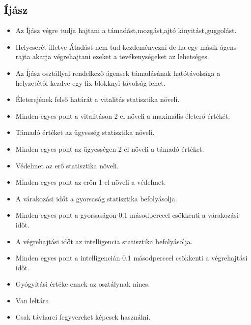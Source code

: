\subsection{Íjász}
\begin{itemize}
\item Az Íjász végre tudja hajtani a támadást,mozgást,ajtó kinyitást,guggolást.
\item Helycserét illetve Átadást nem tud kezdeményezni de ha egy másik ágens rajta akarja végrehajtani ezeket a tevékenységeket az lehetséges.
\item Az Íjász osztállyal rendelkező ágensek támadásának hatótávolsága a helyzetétől kezdve egy fix blokknyi távolság lehet.
\item Életerejének felső határát a vitalitás statisztika növeli.
\item Minden egyes pont a vitalitáson 2-el növeli a maximális életerő értékét.
\item Támadó értéket az ügyesség statisztika növeli.
\item Minden egyes pont az ügyességen 2-el növeli a támadó értéket.
\item Védelmet az erő statisztika növeli.
\item Minden egyes pont az erőn 1-el növeli a védelmet.
\item A várakozási időt a gyorsaság statisztika befolyásolja.
\item Minden egyes pont a gyorsaságon 0.1 másodperccel csökkenti a várakozási időt.
\item A végrehajtási időt az intelligencia statisztika befolyásolja.
\item Minden egyes pont a intelligencián 0.1 másodperccel csökkenti a végrehajtási időt.
\item Gyógyítási értéke ennek az osztálynak nincs.
\item Van leltára.
\item Csak távharci fegyvereket képesek használni.
\end{itemize}

